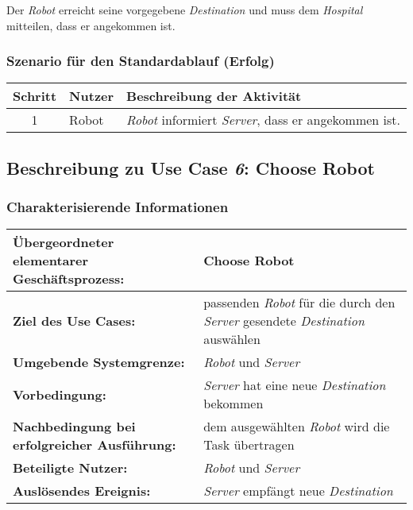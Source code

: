 			Der \emph{Robot} erreicht seine vorgegebene \emph{Destination} und muss dem \emph{Hospital} mitteilen, dass er angekommen ist. 

			\subsubsection*{Szenario für den Standardablauf (Erfolg)}

			\begin{table}[H]
				\centering
				\begin{tabularx}{\textwidth}{@{}cp{2cm}X@{}}
				\hline
				Schritt & Nutzer & Beschreibung der Aktivität \\ \hline
				1 & Robot & \emph{Robot} informiert \emph{Server}, dass er angekommen ist.
				\hline
				\end{tabularx}
			\end{table}

			
		\pagebreak

		\subsection{Beschreibung zu Use Case \emph{6}: Choose Robot}

			\subsubsection*{Charakterisierende Informationen}

			\begin{table}[H]
				\centering
				\begin{tabularx}{\textwidth}{@{}p{5cm}X@{}}
				\hline
				\textbf{Übergeordneter elementarer Geschäftsprozess:} & Choose Robot \\ \hline
				\textbf{Ziel des Use Cases:} & passenden \emph{Robot} für die durch den \emph{Server} gesendete \emph{Destination} auswählen\\ \hline
				\textbf{Umgebende Systemgrenze:} & \emph{Robot} und \emph{Server} \\ \hline
				\textbf{Vorbedingung:} & \emph{Server} hat eine neue \emph{Destination} bekommen\\ \hline
				\textbf{Nachbedingung bei erfolgreicher Ausführung:} & dem ausgewählten \emph{Robot} wird die Task übertragen\\ \hline
				\textbf{Beteiligte Nutzer:} & \emph{Robot} und \emph{Server}\\ \hline
				\textbf{Auslösendes Ereignis:} & \emph{Server} empfängt neue \emph{Destination}\\
				\hline
				\end{tabularx}
			\end{table}

